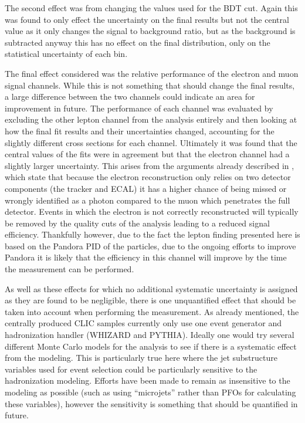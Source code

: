 The second effect was from changing the values used for the \ac{BDT} cut. Again this was found to only effect the uncertainty on the final results but not the central value as it only changes the signal to background ratio, but as the background is subtracted anyway this has no effect on the final distribution, only on the statistical uncertainty of each bin.

The final effect considered was the relative performance of the electron and muon signal channels. While this is not something that should change the final results, a large difference between the two channels could indicate an area for improvement in future. The performance of each channel was evaluated by excluding the other lepton channel from the analysis entirely and then looking at how the final fit results and their uncertainties changed, accounting for the slightly different cross sections for each channel. Ultimately it was found that the central values of the fits were in agreement but that the electron channel had a slightly larger uncertainty. This arises from the arguments already described in , which state that because the electron reconstruction only relies on two detector components (the tracker and \ac{ECAL}) it has a higher chance of being missed or wrongly identified as a photon compared to the muon which penetrates the full detector. Events in which the electron is not correctly reconstructed will typically be removed by the quality cuts of the analysis leading to a reduced signal efficiency. Thankfully however, due to the fact the lepton finding presented here is based on the Pandora \ac{PID} of the particles, due to the ongoing efforts to improve Pandora it is likely that the efficiency in this channel will improve by the time the measurement can be performed. 

As well as these effects for which no additional systematic uncertainty is assigned as they are found to be negligible, there is one unquantified effect that should be taken into account when performing the measurement. As already mentioned, the centrally produced \ac{CLIC} samples currently only use one event generator and hadronization handler (WHIZARD and PYTHIA). Ideally one would try several different Monte Carlo models for the analysis to see if there is a systematic effect from the modeling. This is particularly true here where the jet substructure variables used for event selection could be particularly sensitive to the hadronization modeling. Efforts have been made to remain as insensitive to the modeling as possible (such as using ``microjets'' rather than PFOs for calculating these variables), however the sensitivity is something that should be quantified in future.

